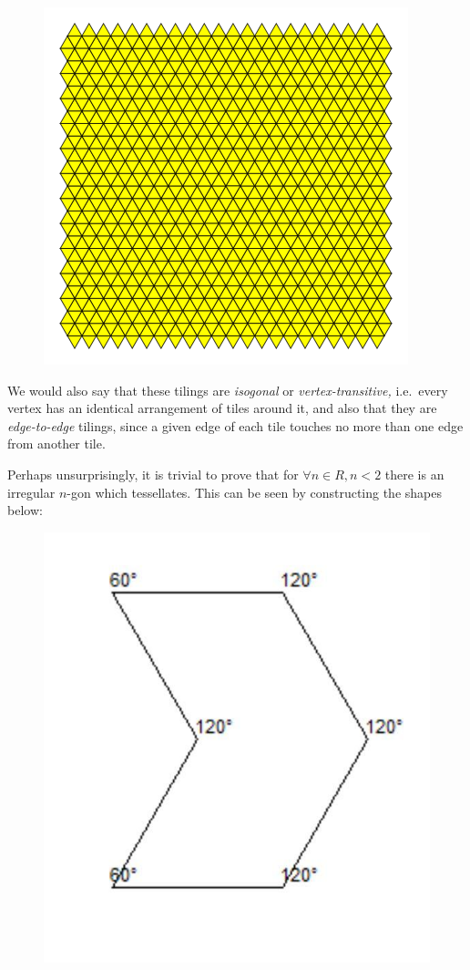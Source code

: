 \begin{figure}[htbp]
\centering
\includegraphics{image_2.png}
\caption{}
\end{figure}

We would also say that these tilings are \emph{isogonal} or
\emph{vertex-transitive,} i.e.~every vertex has an identical arrangement
of tiles around it, and also that they are \emph{edge-to-edge} tilings,
since a given edge of each tile touches no more than one edge from
another tile.

Perhaps unsurprisingly, it is trivial to prove that for \(∀ n∈R, n<2\)
there is an irregular \(n\)-gon which tessellates. This can be seen by
constructing the shapes below:

\begin{figure}[htbp]
\centering
\includegraphics{image_3.jpg}
\caption{}
\end{figure}

